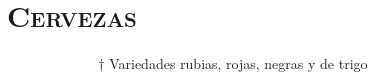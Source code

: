 \section{\textsc{\textbf{Cervezas}}}


$ \>  \>  \>  \>  \>  \>  \>  \>  \>  \>  \>  \>  \>  \>  \>  \>  \>  \>  \>  \>  \>  \>  \>  \>  \>  \>  \>  \>  $ $\dag$ 
Variedades rubias, rojas, negras y de trigo

